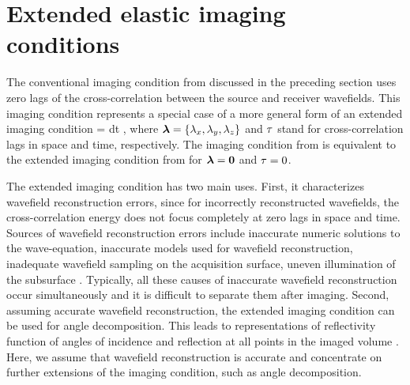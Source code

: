 \section{Extended elastic imaging conditions}

The conventional imaging condition from  discussed in the
preceding section uses zero lags of the
cross-correlation between the source and receiver wavefields. This
imaging condition represents a special case of a more general form of
an extended imaging
condition \cite[]{SavaFomel.geo.tsic}
%
\beq \label{eqn:XIC}
\IM{}\ofxlt = \int \US{}\ofxlm \UR{}\ofxlp dt \;,
\eeq
%
where $\hh=\{\lambda_x,\lambda_y,\lambda_z\}$ and $\tt$ stand for
cross-correlation lags in space and time, respectively. The imaging
condition from  is equivalent to the extended imaging condition
from  for $\hh=\mathbf{0}$ and $\tt=0$.

The extended imaging condition has two main uses.  First, it
characterizes wavefield reconstruction errors, since for incorrectly
reconstructed wavefields, the cross-correlation energy does not focus
completely at zero lags in space and time. Sources of wavefield
reconstruction errors include inaccurate numeric solutions to the
wave-equation, inaccurate  models used for
wavefield reconstruction, inadequate wavefield sampling on the
acquisition surface,  uneven illumination of the
subsurface . Typically, all these causes of inaccurate
wavefield reconstruction occur simultaneously and it is difficult to
separate them after imaging. Second, assuming accurate wavefield
reconstruction, the extended imaging condition can be used for angle
decomposition. This leads to representations of reflectivity
 function of angles of incidence and reflection at all
points in the imaged volume \cite[]{SavaFomel.geo.ang}. Here, we
assume that wavefield reconstruction is accurate and concentrate on
further extensions of the imaging condition, such as angle
decomposition.



